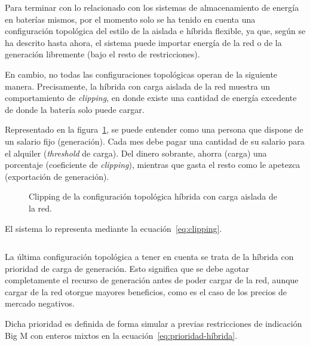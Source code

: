 \begin{equation}
  \label{eq:indicador-curtailment}
\end{equation}

Para terminar con lo relacionado con los sistemas de almacenamiento de energía en baterías mismos, por el momento solo se ha tenido en cuenta una configuración topológica del estilo de la aislada e híbrida flexible, ya que, según se ha descrito hasta ahora, el sistema puede importar energía de la red o de la generación libremente (bajo el resto de restricciones).

En cambio, no todas las configuraciones topológicas operan de la siguiente manera. Precisamente, la híbrida con carga aislada de la red muestra un comportamiento de \textit{clipping}, en donde existe una cantidad de energía excedente de donde la batería solo puede cargar.

Representado en la figura~\ref{fig:clipping}, se puede entender como una persona que dispone de un salario fijo (generación). Cada mes debe pagar una cantidad de su salario para el alquiler (\textit{threshold} de carga). Del dinero sobrante, ahorra (carga) una porcentaje (coeficiente de \textit{clipping}), mientras que gasta el resto como le apetezca (exportación de generación).

\begin{figure}
  \centering
  \caption[Clipping de configuración topológica híbrida.]{Clipping de la configuración topológica híbrida con carga aislada de la red.}
  \label{fig:clipping}
\end{figure}

El sistema lo representa mediante la ecuación~\ref{eq:clipping}.

\begin{equation}
  \label{eq:clipping}
\end{equation}

La última configuración topológica a tener en cuenta se trata de la híbrida con prioridad de carga de generación. Esto significa que se debe agotar completamente el recurso de generación antes de poder cargar de la red, aunque cargar de la red otorgue mayores beneficios, como es el caso de los precios de mercado negativos.

Dicha prioridad es definida de forma simular a previas restricciones de indicación Big M con enteros mixtos en la ecuación~\ref{eq:prioridad-híbrida}.

\begin{equation}
  \label{eq:prioridad-híbrida}
\end{equation}

